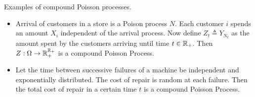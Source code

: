 \documentclass[12pt,aspectratio=169]{beamer}
\begin{document}
\begin{frame}
\begin{Example}  Examples of compound Poisson processes. 
\begin{itemize}
\item Arrival of customers in a store is a Poison process $N$. 
Each customer $i$ spends an \iid amount $X_i$ independent of the arrival process. 
Now define $Z_t \triangleq Y_{N_t}$ as the amount spent by the customers arriving until time $t \in \mathbb{R}_+$. 
Then $Z:\Omega\to\mathbb{R}_+^{\mathbb{R}_+}$ is a compound Poisson Process.
\item<2-> Let the time between successive failures of a machine be independent and exponentially distributed. 
The cost of repair is \iid random at each failure. 
Then the total cost of repair in a certain time $t$ is a compound Poisson Process. 
\end{itemize}
\end{Example}
\end{frame}
\end{document}
